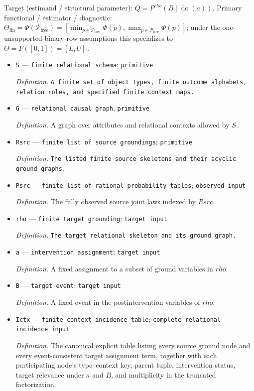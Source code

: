 \documentclass{article}
\begin{document}
Target (estimand / structural parameter): \(Q=P^{rho}(B\mid\operatorname{do}(a))\).
Primary functional / estimator / diagnostic: \(\Theta_{\mathrm{fin}}=\Phi(\mathcal P_{\mathrm{free}})=[\min_{p\in\mathcal P_{\mathrm{free}}}\Phi(p),\max_{p\in\mathcal P_{\mathrm{free}}}\Phi(p)]\); under the one-unsupported-binary-row assumptions this specializes to \(\Theta=F([0,1])=[L,U]\)..
\begin{itemize}
  \item \texttt{S} --- \texttt{finite relational schema}; \texttt{primitive}
  \par\smallskip\noindent\emph{Definition.} \texttt{A finite set of object types,\allowbreak{} finite outcome alphabets,\allowbreak{} relation roles,\allowbreak{} and specified finite context maps.}
  \item \texttt{G} --- \texttt{relational causal graph}; \texttt{primitive}
  \par\smallskip\noindent\emph{Definition.} A graph over attributes and relational contexts allowed by \(S\).
  \item \texttt{Rsrc} --- \texttt{finite list of source groundings}; \texttt{primitive}
  \par\smallskip\noindent\emph{Definition.} \texttt{The listed finite source skeletons and their acyclic ground graphs.}
  \item \texttt{Psrc} --- \texttt{finite list of rational probability tables}; \texttt{observed input}
  \par\smallskip\noindent\emph{Definition.} The fully observed source joint laws indexed by \(Rsrc\).
  \item \texttt{rho} --- \texttt{finite target grounding}; \texttt{target input}
  \par\smallskip\noindent\emph{Definition.} \texttt{The target relational skeleton and its ground graph.}
  \item \texttt{a} --- \texttt{intervention assignment}; \texttt{target input}
  \par\smallskip\noindent\emph{Definition.} A fixed assignment to a subset of ground variables in \(rho\).
  \item \texttt{B} --- \texttt{target event}; \texttt{target input}
  \par\smallskip\noindent\emph{Definition.} A fixed event in the postintervention variables of \(rho\).
  \item \texttt{Ictx} --- \texttt{finite context-\allowbreak{}incidence table}; \texttt{complete relational incidence input}
  \par\smallskip\noindent\emph{Definition.} The canonical explicit table listing every source ground node and every event-consistent target assignment term, together with each participating node's type--context key, parent tuple, intervention status, target relevance under \(a\) and \(B\), and multiplicity in the truncated factorization.

\end{itemize}
\end{document}
